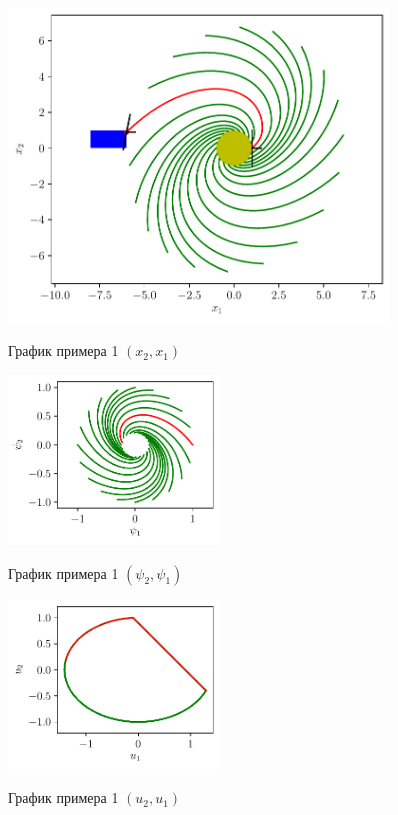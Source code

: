 \documentclass[12pt, a4paper]{article} %
\begin{document}
\begin{figure}[H]
    \begin{centering}
        \includegraphics[width=0.9\textwidth]{figures/ex1_x.pdf}
        \label{fig:ex1_x}
        \caption{График примера 1 $(x_2, x_1)$}
    \end{centering}
    \vfill
    \begin{multicols}{2}
        \includegraphics[width=0.5\textwidth]{figures/ex1_p.pdf}
        \label{fig:ex1_p}
        \caption{График примера 1 $(\psi_2, \psi_1)$}
       \hfill 
       \includegraphics[width=0.5\textwidth]{figures/ex1_u.pdf}
        \label{fig:ex1_u}
        \caption{График примера 1 $(u_2, u_1)$}
    \end{multicols}
\end{figure} 
\end{document}
